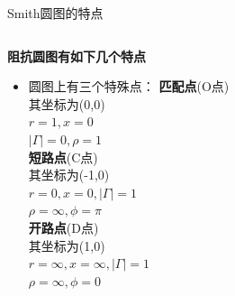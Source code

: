 \begin{frame}{Smith圆图的特点}
  \begin{columns}
    \begin{column}{0.4\linewidth}
      \textbf{阻抗圆图有如下几个特点}
      \begin{itemize}
        \item 圆图上有三个特殊点：
              \footnotesize{\textbf{匹配点}(O点)\\
              其坐标为(0,0)\\
              $r=1,x=0$ \\
              $\lvert\Gamma\rvert=0,\rho=1$\\
              \textbf{短路点}(C点)\\
              其坐标为(-1,0)\\
              $r=0,x=0,\lvert\Gamma\rvert=1$ \\
              $\rho=\infty,\phi=\pi$ \\
              \textbf{开路点}(D点)\\
              其坐标为(1,0)\\
              $r=\infty,x=\infty,\lvert\Gamma\rvert=1$ \\
              $\rho=\infty,\phi=0$}
      \end{itemize}


\end{column}
\end{columns}
\end{frame}
